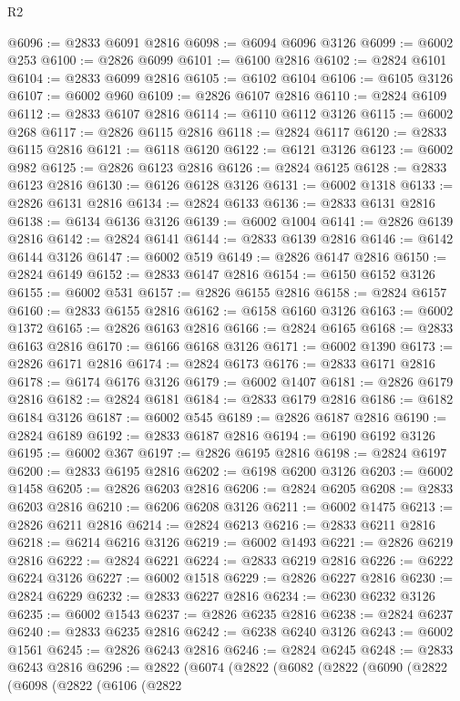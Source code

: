 \begin{lexlean}{R2}
\begin{coremodule}
@6096 := @2833 @6091 @2816
@6098 := @6094 @6096 @3126
@6099 := @6002 @253
@6100 := @2826 @6099
@6101 := @6100 @2816
@6102 := @2824 @6101
@6104 := @2833 @6099 @2816
@6105 := @6102 @6104
@6106 := @6105 @3126
@6107 := @6002 @960
@6109 := @2826 @6107 @2816
@6110 := @2824 @6109
@6112 := @2833 @6107 @2816
@6114 := @6110 @6112 @3126
@6115 := @6002 @268
@6117 := @2826 @6115 @2816
@6118 := @2824 @6117
@6120 := @2833 @6115 @2816
@6121 := @6118 @6120
@6122 := @6121 @3126
@6123 := @6002 @982
@6125 := @2826 @6123 @2816
@6126 := @2824 @6125
@6128 := @2833 @6123 @2816
@6130 := @6126 @6128 @3126
@6131 := @6002 @1318
@6133 := @2826 @6131 @2816
@6134 := @2824 @6133
@6136 := @2833 @6131 @2816
@6138 := @6134 @6136 @3126
@6139 := @6002 @1004
@6141 := @2826 @6139 @2816
@6142 := @2824 @6141
@6144 := @2833 @6139 @2816
@6146 := @6142 @6144 @3126
@6147 := @6002 @519
@6149 := @2826 @6147 @2816
@6150 := @2824 @6149
@6152 := @2833 @6147 @2816
@6154 := @6150 @6152 @3126
@6155 := @6002 @531
@6157 := @2826 @6155 @2816
@6158 := @2824 @6157
@6160 := @2833 @6155 @2816
@6162 := @6158 @6160 @3126
@6163 := @6002 @1372
@6165 := @2826 @6163 @2816
@6166 := @2824 @6165
@6168 := @2833 @6163 @2816
@6170 := @6166 @6168 @3126
@6171 := @6002 @1390
@6173 := @2826 @6171 @2816
@6174 := @2824 @6173
@6176 := @2833 @6171 @2816
@6178 := @6174 @6176 @3126
@6179 := @6002 @1407
@6181 := @2826 @6179 @2816
@6182 := @2824 @6181
@6184 := @2833 @6179 @2816
@6186 := @6182 @6184 @3126
@6187 := @6002 @545
@6189 := @2826 @6187 @2816
@6190 := @2824 @6189
@6192 := @2833 @6187 @2816
@6194 := @6190 @6192 @3126
@6195 := @6002 @367
@6197 := @2826 @6195 @2816
@6198 := @2824 @6197
@6200 := @2833 @6195 @2816
@6202 := @6198 @6200 @3126
@6203 := @6002 @1458
@6205 := @2826 @6203 @2816
@6206 := @2824 @6205
@6208 := @2833 @6203 @2816
@6210 := @6206 @6208 @3126
@6211 := @6002 @1475
@6213 := @2826 @6211 @2816
@6214 := @2824 @6213
@6216 := @2833 @6211 @2816
@6218 := @6214 @6216 @3126
@6219 := @6002 @1493
@6221 := @2826 @6219 @2816
@6222 := @2824 @6221
@6224 := @2833 @6219 @2816
@6226 := @6222 @6224 @3126
@6227 := @6002 @1518
@6229 := @2826 @6227 @2816
@6230 := @2824 @6229
@6232 := @2833 @6227 @2816
@6234 := @6230 @6232 @3126
@6235 := @6002 @1543
@6237 := @2826 @6235 @2816
@6238 := @2824 @6237
@6240 := @2833 @6235 @2816
@6242 := @6238 @6240 @3126
@6243 := @6002 @1561
@6245 := @2826 @6243 @2816
@6246 := @2824 @6245
@6248 := @2833 @6243 @2816
@6296 := @2822
    (@6074
      (@2822
        (@6082
          (@2822
            (@6090
              (@2822
                (@6098
                  (@2822
                    (@6106
                      (@2822

\end{coremodule}
\end{lexlean}
